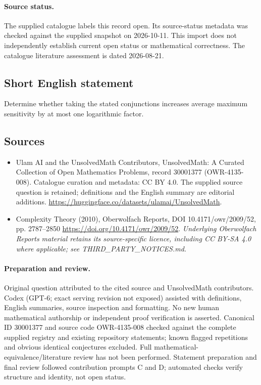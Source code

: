 \documentclass[11pt]{article}
\begin{document}
\paragraph{Source status.}
The supplied catalogue labels this record open. Its source-status metadata was checked against the supplied snapshot on 2026-10-11. This import does not independently establish current open status or mathematical correctness. The catalogue literature assessment is dated 2026-08-21.
\subsection{Short English statement}
Determine whether taking the stated conjunctions increases average maximum sensitivity by at most one logarithmic factor.
\subsection{Sources}
\begin{itemize}
\item[S1] Ulam AI and the UnsolvedMath Contributors, UnsolvedMath: A Curated Collection of Open Mathematics Problems, record 30001377 (OWR-4135-008). Catalogue curation and metadata: CC BY 4.0. The supplied source question is retained; definitions and the English summary are editorial additions.
\url{https://huggingface.co/datasets/ulamai/UnsolvedMath}.
\item[S2] Complexity Theory (2010), Oberwolfach Reports, DOI 10.4171/owr/2009/52, pp. 2787--2850
\url{https://doi.org/10.4171/owr/2009/52}.
\textit{Underlying Oberwolfach Reports material retains its source-specific licence, including CC BY-SA 4.0 where applicable; see THIRD\_PARTY\_NOTICES.md.}
\end{itemize}
\paragraph{Preparation and review.}
Original question attributed to the cited source and UnsolvedMath contributors. Codex (GPT-6; exact serving revision not exposed) assisted with definitions, English summaries, source inspection and formatting. No new human mathematical authorship or independent proof verification is asserted. Canonical ID 30001377 and source code OWR-4135-008 checked against the complete supplied registry and existing repository statements; known flagged repetitions and obvious identical conjectures excluded. Full mathematical-equivalence/literature review has not been performed. Statement preparation and final review followed contribution prompts C and D; automated checks verify structure and identity, not open status.
\label{end:30001377}
\end{document}
